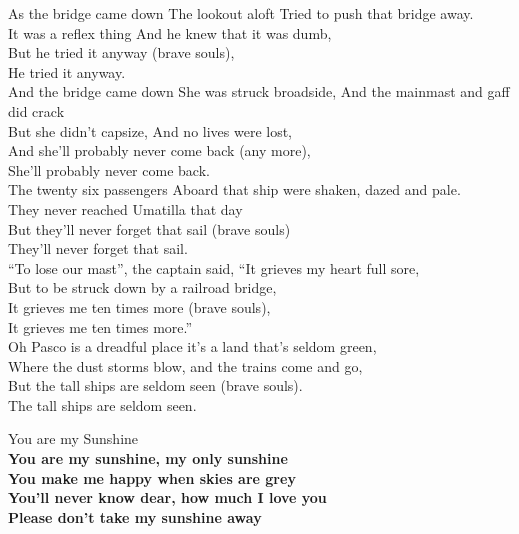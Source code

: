 \documentclass[letterpaper,9pt]{article}
\begin{document}
As the bridge came down The lookout aloft Tried to push that bridge away. \\
It was a reflex thing And he knew that it was dumb, \\
But he tried it anyway (brave souls), \\
He tried it anyway. \\

And the bridge came down She was struck broadside, And the mainmast and gaff did crack \\
But she didn't capsize, And no lives were lost, \\
And she'll probably never come back (any more), \\
She'll probably never come back. \\

The twenty six passengers Aboard that ship were shaken, dazed and pale. \\
They never reached Umatilla that day \\
But they'll never forget that sail (brave souls) \\
They'll never forget that sail. \\

“To lose our mast”, the captain said, “It grieves my heart full sore, \\
But to be struck down by a railroad bridge, \\
It grieves me ten times more (brave souls), \\
It grieves me ten times more.” \\

Oh Pasco is a dreadful place it's a land that's seldom green, \\
Where the dust storms blow, and the trains come and go, \\
But the tall ships are seldom seen (brave souls). \\
The tall ships are seldom seen. \\

\newpage
{}
\Huge
You are my Sunshine\\

\huge
\textbf{You are my sunshine, my only sunshine \\
You make me happy when skies are grey \\
You'll never know dear, how much I love you \\
Please don't take my sunshine away} \\
\end{document}
